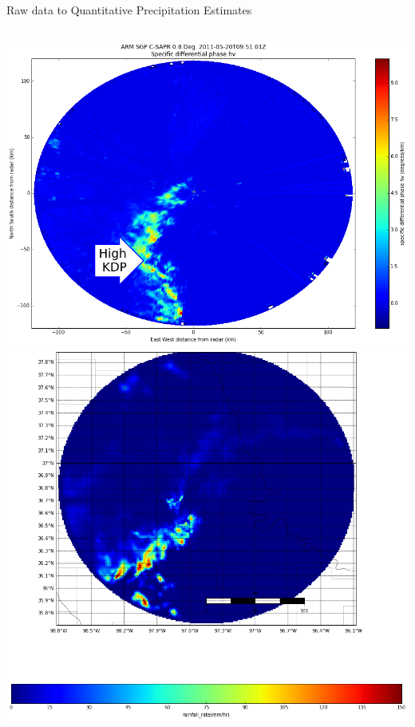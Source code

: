 \documentclass[final]{beamer}
\begin{document}
\begin{frame}{}
\begin{columns}[t]
\begin{column}{.3\linewidth}
\begin{block}{Raw data to Quantitative Precipitation Estimates}
\begin{columns}[t]
\begin{column}{.6\linewidth}
\begin{columns}[t]
\begin{column}{.5\linewidth}
           		\includegraphics[width=1.0\linewidth]{figures/kdp.png}\\[1ex]    %
			\includegraphics[width=1.0\linewidth]{figures/qpe.png}\\[1ex]  
		

\end{column}
\end{columns}
\end{column}
\end{columns}
\end{block}
\end{column}
\end{columns}
\end{frame}
\end{document}
